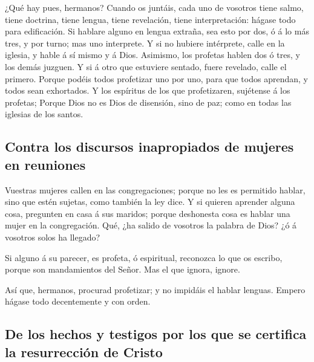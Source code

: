  ¿Qué hay pues, hermanos? Cuando os juntáis, cada uno de
vosotros tiene salmo, tiene doctrina, tiene lengua, tiene revelación,
tiene interpretación: hágase todo para edificación.  Si
hablare alguno en lengua extraña, sea esto por dos, ó á lo más tres, y
por turno; mas uno interprete.  Y si no hubiere
intérprete, calle en la iglesia, y hable á sí mismo y á Dios.
 Asimismo, los profetas hablen dos ó tres, y los demás
juzguen.  Y si á otro que estuviere sentado, fuere
revelado, calle el primero.  Porque podéis todos
profetizar uno por uno, para que todos aprendan, y todos sean
exhortados.  Y los espíritus de los que profetizaren,
sujétense á los profetas;  Porque Dios no es Dios de
disensión, sino de paz; como en todas las iglesias de los santos.

\hypertarget{contra-los-discursos-inapropiados-de-mujeres-en-reuniones}{%
\subsection{Contra los discursos inapropiados de mujeres en
reuniones}\label{contra-los-discursos-inapropiados-de-mujeres-en-reuniones}}

 Vuestras mujeres callen en las congregaciones; porque no
les es permitido hablar, sino que estén sujetas, como también la ley
dice.  Y si quieren aprender alguna cosa, pregunten en
casa á sus maridos; porque deshonesta cosa es hablar una mujer en la
congregación.  Qué, ¿ha salido de vosotros la palabra de
Dios? ¿ó á vosotros solos ha llegado?

 Si alguno á su parecer, es profeta, ó espiritual,
reconozca lo que os escribo, porque son mandamientos del Señor.
 Mas el que ignora, ignore.

 Así que, hermanos, procurad profetizar; y no impidáis el
hablar lenguas.  Empero hágase todo decentemente y con
orden.

\hypertarget{de-los-hechos-y-testigos-por-los-que-se-certifica-la-resurrecciuxf3n-de-cristo}{%
\subsection{De los hechos y testigos por los que se certifica la
resurrección de
Cristo}\label{de-los-hechos-y-testigos-por-los-que-se-certifica-la-resurrecciuxf3n-de-cristo}}

